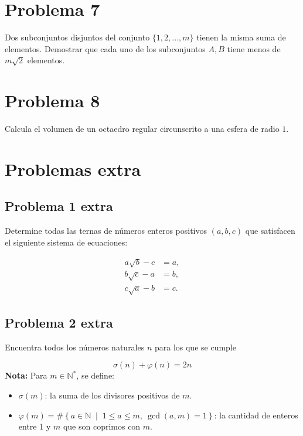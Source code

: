 \documentclass{article}
\begin{document}
\section{Problema 7}

    Dos subconjuntos disjuntos del conjunto $\{1,2, ... ,m\}$ tienen la misma suma de elementos. Demostrar que cada uno de los subconjuntos $A,B$ tiene menos de $m\sqrt{2}$ elementos.

\section{Problema 8}

    Calcula el volumen de un octaedro regular circunscrito a una esfera de radio $1$.

    
\section{Problemas extra}
\subsection{Problema 1 extra}

Determine todas las ternas de números enteros positivos \( (a, b, c) \) que satisfacen el siguiente sistema de ecuaciones:

\begin{align*}
    a\sqrt{b} - c &= a, \\
    b\sqrt{c} - a &= b, \\
    c\sqrt{a} - b &= c.
\end{align*}

\subsection{Problema 2 extra}

Encuentra todos los números naturales $n$ para los que se cumple 

\[
    \sigma(n) + \varphi(n) = 2n
\]
\textbf{Nota:} Para \( m \in \mathbb{N}^{*} \), se define:

\begin{itemize}
    \item \( \sigma(m) \): la suma de los divisores positivos de \( m \).
    \item \( \varphi(m) = \#\left\{ a \in \mathbb{N} \;\middle|\; 1 \leq a \leq m,\ \gcd(a, m) = 1 \right\} \): la cantidad de enteros entre 1 y \( m \) que son coprimos con \( m \).
\end{itemize}
\end{document}
